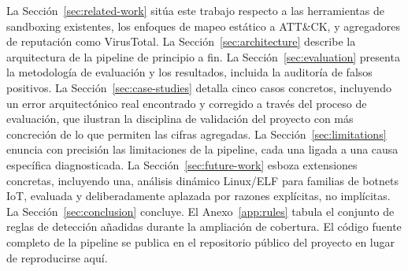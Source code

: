La Secci\'on~\ref{sec:related-work} sit\'ua este trabajo respecto a las
herramientas de sandboxing existentes, los enfoques de mapeo est\'atico
a ATT\&CK, y agregadores de reputaci\'on como VirusTotal. La
Secci\'on~\ref{sec:architecture} describe la arquitectura de la
pipeline de principio a fin. La Secci\'on~\ref{sec:evaluation}
presenta la metodolog\'ia de evaluaci\'on y los resultados, incluida la
auditor\'ia de falsos positivos. La Secci\'on~\ref{sec:case-studies}
detalla cinco casos concretos, incluyendo un error arquitect\'onico real
encontrado y corregido a trav\'es del proceso de evaluaci\'on, que
ilustran la disciplina de validaci\'on del proyecto con m\'as
concreci\'on de lo que permiten las cifras agregadas. La
Secci\'on~\ref{sec:limitations} enuncia con precisi\'on las
limitaciones de la pipeline, cada una ligada a una causa espec\'ifica
diagnosticada. La Secci\'on~\ref{sec:future-work} esboza extensiones
concretas, incluyendo una, an\'alisis din\'amico Linux/ELF para
familias de botnets IoT, evaluada y deliberadamente aplazada por
razones expl\'icitas, no impl\'icitas. La Secci\'on~\ref{sec:conclusion}
concluye. El Anexo~\ref{app:rules} tabula el conjunto de reglas de
detecci\'on a\~nadidas durante la ampliaci\'on de cobertura. El
c\'odigo fuente completo de la pipeline se publica en el repositorio
p\'ublico del proyecto en lugar de reproducirse aqu\'i.
